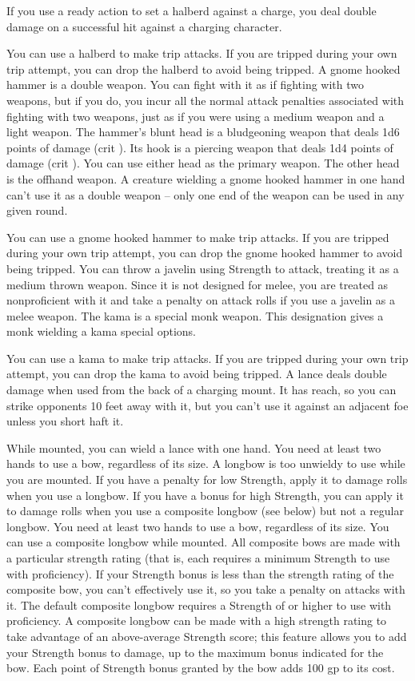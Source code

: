  If you use a ready action to set a halberd against a charge, you deal double damage on a successful hit against a charging character.
\par You can use a halberd to make trip attacks. If you are tripped during your own trip attempt, you can drop the halberd to avoid being tripped.
 A gnome hooked hammer is a double weapon. You can fight with it as if fighting with two weapons, but if you do, you incur all the normal attack penalties associated with fighting with two weapons, just as if you were using a medium weapon and a light weapon. The hammer's blunt head is a bludgeoning weapon that deals 1d6 points of damage (crit ). Its hook is a piercing weapon that deals 1d4 points of damage (crit ). You can use either head as the primary weapon. The other head is the offhand weapon. A creature wielding a gnome hooked hammer in one hand can't use it as a double weapon -- only one end of the weapon can be used in any given round.
\par You can use a gnome hooked hammer to make trip attacks. If you are tripped during your own trip attempt, you can drop the gnome hooked hammer to avoid being tripped.
 You can throw a javelin using Strength to attack, treating it as a medium thrown weapon. Since it is not designed for melee, you are treated as nonproficient with it and take a  penalty on attack rolls if you use a javelin as a melee weapon.
 The kama is a special monk weapon. This designation gives a monk wielding a kama special options.
\par You can use a kama to make trip attacks. If you are tripped during your own trip attempt, you can drop the kama to avoid being tripped.
 A lance deals double damage when used from the back of a charging mount. It has reach, so you can strike opponents 10 feet away with it, but you can't use it against an adjacent foe unless you short haft it.
\par While mounted, you can wield a lance with one hand.
 You need at least two hands to use a bow, regardless of its size. A longbow is too unwieldy to use while you are mounted. If you have a penalty for low Strength, apply it to damage rolls when you use a longbow. If you have a bonus for high Strength, you can apply it to damage rolls when you use a composite longbow (see below) but not a regular longbow.
 You need at least two hands to use a bow, regardless of its size. You can use a composite longbow while mounted. All composite bows are made with a particular strength rating (that is, each requires a minimum Strength to use with proficiency). If your Strength bonus is less than the strength rating of the composite bow, you can't effectively use it, so you take a  penalty on attacks with it. The default composite longbow requires a Strength of  or higher to use with proficiency. A composite longbow can be made with a high strength rating to take advantage of an above-average Strength score; this feature allows you to add your Strength bonus to damage, up to the maximum bonus indicated for the bow. Each point of Strength bonus granted by the bow adds 100 gp to its cost.
